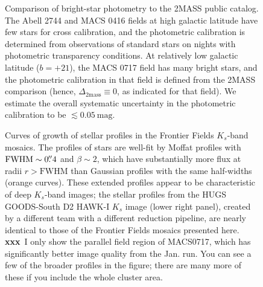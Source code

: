 \documentclass[iop, numberedappendix]{emulateapj}
\gdef\xxx{\textbf{xxx}}
\begin{document}
\begin{figure}[!ht]
\caption{Comparison of bright-star photometry to the 2MASS public catalog.  The Abell 2744 and MACS 0416 fields at high galactic latitude have few stars for cross calibration, and the photometric calibration is determined from observations of standard stars on nights with photometric transparency conditions.  At relatively low galactic latitude ($b=+21$), the MACS 0717 field has many bright stars, and the photometric calibration in that field is defined from the 2MASS comparison (hence, $\Delta_\mathrm{2mass}\equiv0$, as indicated for that field).  We estimate the overall systematic uncertainty in the photometric calibration to be $\lesssim0.05~\mathrm{mag}$.\label{fig:2mass}}  
\end{figure}

\begin{figure}[!ht]
\caption{Curves of growth of stellar profiles in the Frontier Fields $K_s$-band mosaics.  The profiles of stars are well-fit by Moffat profiles with $\mathrm{FWHM}\sim0\mbox{$.\!\!^{\prime\prime}$}4$ and $\beta\sim2$, which have substantially more flux at radii $r>\mathrm{FWHM}$ than Gaussian profiles with the same half-widths (orange curves).  These extended profiles appear to be characteristic of deep $K_s$-band images; the stellar profiles from the HUGS GOODS-South D2 HAWK-I $K_s$ image \citep{hugs} (lower right panel), created by a different team with a different reduction pipeline, are nearly identical to those of the Frontier Fields mosaics presented here. \xxx\ I only show the parallel field region of MACS0717, which has significantly better image quality from the Jan. run.  You can see a few of the broader profiles in the figure; there are many more of these if you include the whole cluster area.  \label{fig:cog}}  
\end{figure}
\end{document}
